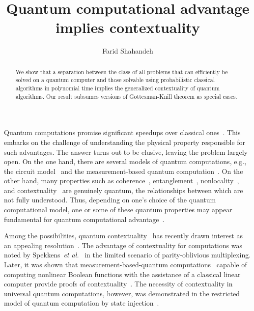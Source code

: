 \documentclass[prl,twocolumn,amsmath,amssymb,nofootinbib]{revtex4-1}
\begin{document}
\title{Quantum computational advantage implies contextuality}
\author{Farid Shahandeh}

\begin{abstract}
We show that a separation between the class of all problems that can efficiently be solved on a quantum computer and those solvable using probabilistic classical algorithms in polynomial time implies the generalized contextuality of quantum algorithms.
Our result subsumes versions of Gottesman-Knill theorem as special cases.
\end{abstract}

\maketitle

Quantum computations promise significant speedups over classical ones~\cite{Preskill2012,Deutsch1992,Shor1994,Aaronson2013}.
This embarks on the challenge of understanding the physical property responsible for such advantages.
The answer turns out to be elusive, leaving the problem largely open.
On the one hand, there are several models of quantum computations, e.g., the circuit model~\cite{NielsenBook} and the measurement-based quantum computation~\cite{Raussendorf2001,Raussendorf2003,Nielsen2003,Leung2004}.
On the other hand, many properties such as coherence~\cite{Streltsov2017}, entanglement~\cite{Horodecki2009}, nonlocality~\cite{EPR,Bell1964,Bell2004}, and contextuality~\cite{KS,Bell1966,Spekkens2005} are genuinely quantum, the relationships between which are not fully understood.
Thus, depending on one's choice of the quantum computational model, one or some of these quantum properties may appear fundamental for quantum computational advantage~\cite{Matera2016,Jozsa2003,Vidal2003,Gross2009,Bravyi2018,Raussendorf2003,Howard2014,Bermejo-Vega2017}.

Among the possibilities, quantum contextuality~\cite{KS,Spekkens2005} has recently drawn interest as an appealing resolution~\cite{Raussendorf2003,Howard2014,Bermejo-Vega2017}.
The advantage of contextuality for computations was noted by Spekkens~\textit{et al.}~\cite{Spekkens2009} in the limited scenario of parity-oblivious multiplexing.
Later, it was shown that measurement-based-quantum computations~\cite{Raussendorf2001,Anders2009} capable of computing nonlinear Boolean functions with the assistance of a classical linear computer provide proofs of contextuality~\cite{Raussendorf2013,Frembs2018}.
The necessity of contextuality in universal quantum computations, however, was demonstrated in the restricted model of quantum computation by state injection~\cite{Howard2014,Delfosse2015,Bermejo-Vega2017,Raussendorf2017,Karanjai2018,Schmid2021}.
\end{document}
